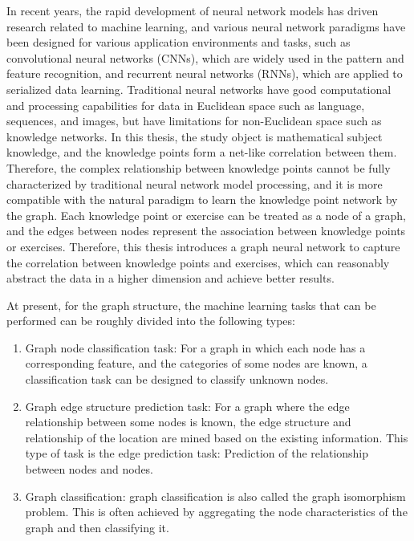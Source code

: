 
In recent years, the rapid development of neural network models has driven research related to machine learning, and various neural network paradigms have been designed for various application environments and tasks, such as convolutional neural networks (CNNs), which are widely used in the pattern and feature recognition, and recurrent neural networks (RNNs), which are applied to serialized data learning. Traditional neural networks have good computational and processing capabilities for data in Euclidean space such as language, sequences, and images, but have limitations for non-Euclidean space such as knowledge networks. In this thesis, the study object is mathematical subject knowledge, and the knowledge points form a net-like correlation between them. Therefore, the complex relationship between knowledge points cannot be fully characterized by traditional neural network model processing, and it is more compatible with the natural paradigm to learn the knowledge point network by the graph. Each knowledge point or exercise can be treated as a node of a graph, and the edges between nodes represent the association between knowledge points or exercises. Therefore, this thesis introduces a graph neural network to capture the correlation between knowledge points and exercises, which can reasonably abstract the data in a higher dimension and achieve better results.

At present, for the graph structure, the machine learning tasks that can be performed can be roughly divided into the following types:
\begin{enumerate}
    \item Graph node classification task: For a graph in which each node has a corresponding feature, and the categories of some nodes are known, a classification task can be designed to classify unknown nodes.
    \item Graph edge structure prediction task: For a graph where the edge relationship between some nodes is known, the edge structure and relationship of the location are mined based on the existing information. This type of task is the edge prediction task: Prediction of the relationship between nodes and nodes.
    \item Graph classification: graph classification is also called the graph isomorphism problem. This is often achieved by aggregating the node characteristics of the graph and then classifying it.
\end{enumerate}


